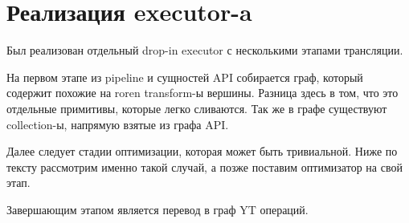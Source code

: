 \section{Реализация executor-a}
\label{sec:executor}

Был реализован отдельный drop-in executor с несколькими этапами трансляции.

На первом этапе из pipeline и сущностей API собирается граф, который содержит похожие на roren transform-ы вершины. Разница здесь в том, что это отдельные примитивы, которые легко сливаются. Так же в графе существуют collection-ы, напрямую взятые из графа API.

Далее следует стадии оптимизации, которая может быть тривиальной. Ниже по тексту рассмотрим именно такой случай, а позже поставим оптимизатор на свой этап.

Завершающим этапом является перевод в граф YT операций.

\newpage

\newpage

\newpage

\newpage

\newpage

